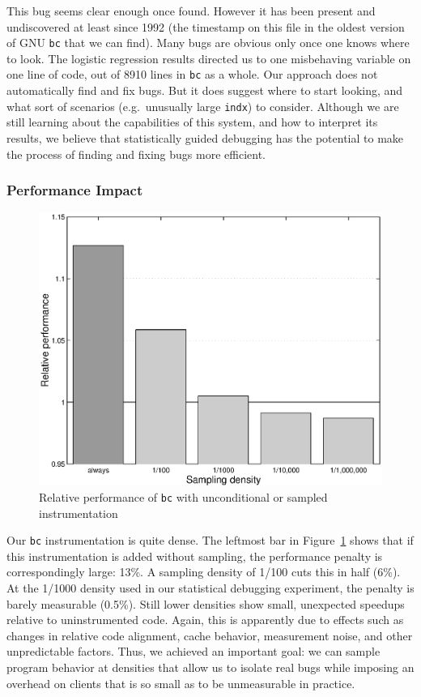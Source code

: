 This bug seems clear enough once found.  However it has been present
and undiscovered at least since 1992 (the time\-stamp on this file in
the oldest version of GNU \texttt{bc} that we can find).  Many bugs
are obvious only once one knows where to look.  The logistic
regression results directed us to one misbehaving variable on one line
of code, out of 8910 lines in \texttt{bc} as a whole.  Our approach
does not automatically find and fix bugs.  But it does suggest where
to start looking, and what sort of scenarios (e.g.\ unusually large
\texttt{indx}) to consider.  Although we are still learning about the
capabilities of this system, and how to interpret its results, we
believe that statistically guided debugging has the potential to make
the process of finding and fixing bugs more efficient.

\subsubsection{Performance Impact}

\begin{figure}
  \centering
  \small
  \includegraphics[width=\columnwidth]{applications/bc_density}
  \caption{Relative performance of \texttt{bc} with unconditional or
    sampled instrumentation}
  \label{fig:bc:slowdown}
\end{figure}

Our \texttt{bc} instrumentation is quite dense.  The leftmost bar in
Figure~\ref{fig:bc:slowdown} shows that if this instrumentation is
added without sampling, the performance penalty is correspondingly
large: 13\%.  A sampling density of 1/100 cuts this in half (6\%).  At
the 1/1000 density used in our statistical debugging experiment, the
penalty is barely measurable (0.5\%).  Still lower densities show
small, unexpected speedups relative to uninstrumented code.  Again,
this is apparently due to effects such as changes in relative code
alignment, cache behavior, measurement noise, and other unpredictable
factors.  Thus, we achieved an important goal: we can sample program
behavior at densities that allow us to isolate real bugs while
imposing an overhead on clients that is so small as to be unmeasurable
in practice.



